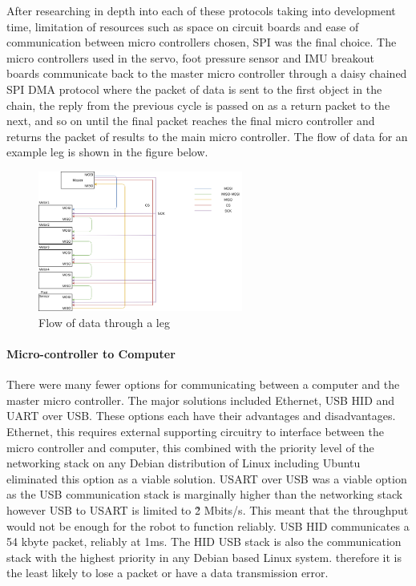         After researching in depth into each of these protocols taking into development time, limitation of resources such as space on circuit boards and ease of communication between micro controllers chosen, SPI was the final choice. The micro controllers used in the servo, foot pressure sensor and IMU breakout boards communicate back to the master micro controller through a daisy chained SPI DMA protocol where the packet of data is sent to the first object in the chain, the reply from the previous cycle is passed on as a return packet to the next, and so on until the final packet reaches the final micro controller and returns the packet of results to the main micro controller. The flow of data for an example leg is shown in the figure below.
        \begin{figure}[H]
        \centering
        \includegraphics[width=0.6\textwidth]{figures/Leg_Flow_Dragram.png}
        \caption{Flow of data through a leg}
        \label{fig:DataFlow_Leg}
        \end{figure}
            \paragraph{Micro-controller to Computer}
            There were many fewer options for communicating between a computer and the master micro controller. The major solutions included Ethernet, USB HID and UART over USB. These options each have their advantages and disadvantages. Ethernet, this requires external supporting circuitry to interface between the micro controller and computer, this combined with the priority level of the networking stack on any Debian distribution of Linux including Ubuntu eliminated this option as a viable solution. USART over USB was a viable option as the USB communication stack is marginally higher than the networking stack however USB to USART is limited to \~2 Mbits/s. This meant that the throughput would not be enough for the robot to function reliably. USB HID communicates a 54 kbyte packet, reliably at 1ms. The HID USB stack is also the communication stack with the highest priority in any Debian based Linux system. therefore it is the least likely to lose a packet or have a data transmission error. 

